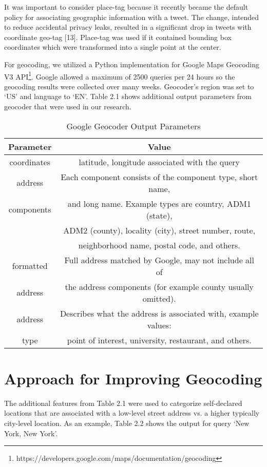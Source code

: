 It was important to consider place-tag because it recently became the default policy for associating geographic information with a tweet. The change, intended to reduce accidental privacy leaks, resulted in a significant drop in tweets with coordinate geo-tag [13]. Place-tag was used if it contained bounding box coordinates which were transformed into a single point at the center. 

For geocoding, we utilized a Python implementation for Google Maps Geocoding V3 API\footnote{https://developers.google.com/maps/documentation/geocoding}. Google allowed a maximum of 2500 queries per 24 hours so the geocoding results were collected over many weeks. Geocoder's region was set to `US' and language to `EN'. Table 2.1 shows additional output parameters from geocoder that were used in our research. 

\begin{table}
\small
\renewcommand{\arraystretch}{1.2}
\caption{Google Geocoder Output Parameters}
\label{table_ch2_1}
\centering
\begin{tabular}{|c|c|}
\hline
\bfseries Parameter & \bfseries Value\\
\hline
coordinates & latitude, longitude associated with the query\\
\hline
address & Each component consists of the component type, short name, \\
components & and long name. Example types are country, ADM1 (state), \\
& ADM2 (county), locality (city), street number, route, \\
& neighborhood name, postal code, and others. \\
 \hline
formatted &	Full address matched by Google, may not include all of \\
address & the address components (for example county usually omitted). \\
 \hline
address & Describes what the address is associated with, example values: \\
type & point of interest, university, restaurant, and others. \\
\hline
\end{tabular}
\end{table}

\section{Approach for Improving Geocoding}

The additional features from Table 2.1 were used to categorize self-declared locations that are associated with a low-level street address vs. a higher typically city-level location. As an example, Table 2.2 shows the output for query `New York, New York'. 

